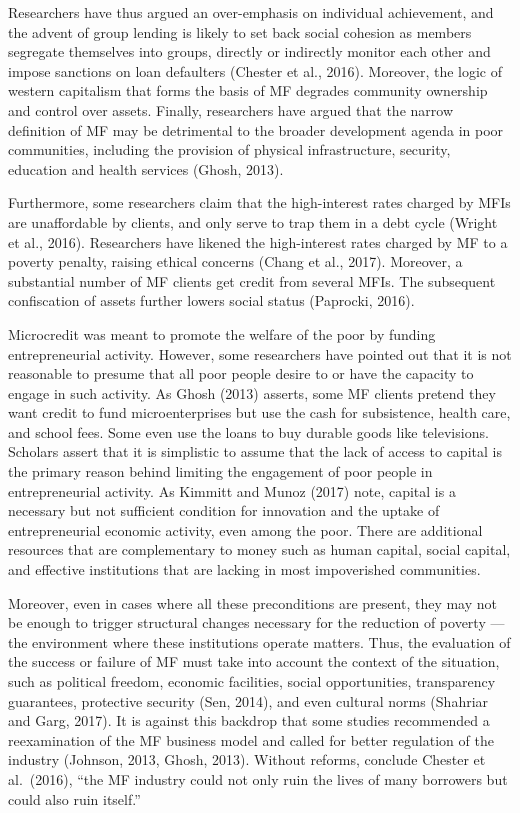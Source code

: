 \documentclass[a4paper, nobind]{templates/ociamthesis}
\begin{document}
Researchers have thus argued an over-emphasis on individual achievement, and the advent of group lending is likely to set back social cohesion as members segregate themselves into groups, directly or indirectly monitor each other and impose sanctions on loan defaulters (Chester et al., 2016). Moreover, the logic of western capitalism that forms the basis of MF degrades community ownership and control over assets. Finally, researchers have argued that the narrow definition of MF may be detrimental to the broader development agenda in poor communities, including the provision of physical infrastructure, security, education and health services (Ghosh, 2013).

Furthermore, some researchers claim that the high-interest rates charged by MFIs are unaffordable by clients, and only serve to trap them in a debt cycle (Wright et al., 2016). Researchers have likened the high-interest rates charged by MF to a poverty penalty, raising ethical concerns (Chang et al., 2017). Moreover, a substantial number of MF clients get credit from several MFIs. The subsequent confiscation of assets further lowers social status (Paprocki, 2016).

Microcredit was meant to promote the welfare of the poor by funding entrepreneurial activity. However, some researchers have pointed out that it is not reasonable to presume that all poor people desire to or have the capacity to engage in such activity. As Ghosh (2013) asserts, some MF clients pretend they want credit to fund microenterprises but use the cash for subsistence, health care, and school fees. Some even use the loans to buy durable goods like televisions. Scholars assert that it is simplistic to assume that the lack of access to capital is the primary reason behind limiting the engagement of poor people in entrepreneurial activity. As Kimmitt and Munoz (2017) note, capital is a necessary but not sufficient condition for innovation and the uptake of entrepreneurial economic activity, even among the poor. There are additional resources that are complementary to money such as human capital, social capital, and effective institutions that are lacking in most impoverished communities.

Moreover, even in cases where all these preconditions are present, they may not be enough to trigger structural changes necessary for the reduction of poverty --- the environment where these institutions operate matters. Thus, the evaluation of the success or failure of MF must take into account the context of the situation, such as political freedom, economic facilities, social opportunities, transparency guarantees, protective security (Sen, 2014), and even cultural norms (Shahriar and Garg, 2017). It is against this backdrop that some studies recommended a reexamination of the MF business model and called for better regulation of the industry (Johnson, 2013, Ghosh, 2013). Without reforms, conclude Chester et al.~(2016), ``the MF industry could not only ruin the lives of many borrowers but could also ruin itself.''
\end{document}
